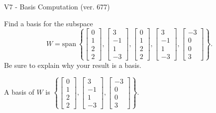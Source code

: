 \begin{exercise}
  \begin{exerciseTitle}V7 - Basis Computation (ver. 677)\end{exerciseTitle}
  \begin{exerciseStatement}
    Find a basis for the subspace 
\[W=\mathrm{span}\ \left\{\left[\begin{array}{r}
0 \\
1 \\
2 \\
2
\end{array}\right] , \left[\begin{array}{r}
3 \\
-1 \\
1 \\
-3
\end{array}\right] , \left[\begin{array}{r}
0 \\
1 \\
2 \\
2
\end{array}\right] , \left[\begin{array}{r}
3 \\
-1 \\
1 \\
-3
\end{array}\right] , \left[\begin{array}{r}
-3 \\
0 \\
0 \\
3
\end{array}\right]\right\}.\]
 Be sure to explain why your result is a basis.


  \end{exerciseStatement}
  \begin{exerciseAnswer}
   A basis of \(W\) is  \(\left\{\left[\begin{array}{r}
0 \\
1 \\
2 \\
2
\end{array}\right] , \left[\begin{array}{r}
3 \\
-1 \\
1 \\
-3
\end{array}\right] , \left[\begin{array}{r}
-3 \\
0 \\
0 \\
3
\end{array}\right]\right\}\).
  


  \end{exerciseAnswer}
\end{exercise}
